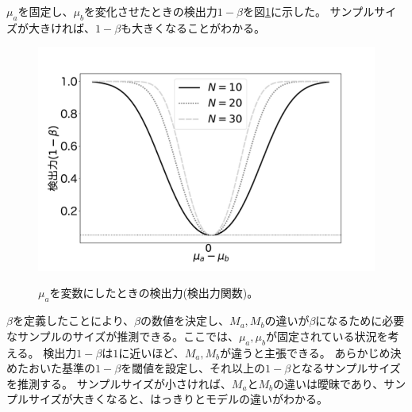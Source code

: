 $\mu_a$を固定し、$\mu_b$を変化させたときの検出力$1-\beta$を図\ref{fig:power_of_test_N_mu0_variable}に示した。
サンプルサイズが大きければ、$1-\beta$も大きくなることがわかる。

\begin{figure}
    \begin{center}
        \includegraphics[width=15cm]{./image/04_/power_of_test.pdf}
        \label{fig:power_of_test_N_mu0_variable}
        \caption{$\mu_a$を変数にしたときの検出力(検出力関数)。}
    \end{center}
\end{figure}

$\beta$を定義したことにより、$\beta$の数値を決定し、$M_a,M_b$の違いが$\beta$になるために必要なサンプルのサイズが推測できる。ここでは、$\mu_a,\mu_b$が固定されている状況を考える。
検出力$1-\beta$は$1$に近いほど、$M_a,M_b$が違うと主張できる。
あらかじめ決めたおいた基準の$1-\beta$を閾値を設定し、それ以上の$1-\beta$となるサンプルサイズを推測する。
サンプルサイズが小さければ、$M_a$と$M_b$の違いは曖昧であり、サンプルサイズが大きくなると、はっきりとモデルの違いがわかる。




